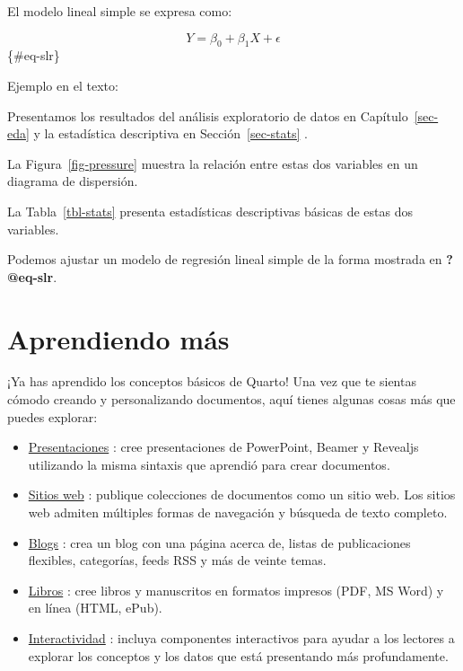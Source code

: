 \documentclass[
  spanish,
  12pt,
  letterpaper,
  DIV=11,
  numbers=noendperiod]{scrreprt}
\begin{document}
El modelo lineal simple se expresa como:

\[Y = \beta_0 + \beta_1 X + \epsilon\] \{\#eq-slr\}

Ejemplo en el texto:

Presentamos los resultados del análisis exploratorio de datos en
Capítulo~\ref{sec-eda} y la estadística descriptiva en
Sección~\ref{sec-stats} .

La Figura~\ref{fig-pressure} muestra la relación entre estas dos
variables en un diagrama de dispersión.

La Tabla~\ref{tbl-stats} presenta estadísticas descriptivas básicas de
estas dos variables.

Podemos ajustar un modelo de regresión lineal simple de la forma
mostrada en \textbf{?@eq-slr}.

\section{\texorpdfstring{\textbf{Aprendiendo
más}}{Aprendiendo más}}\label{aprendiendo-muxe1s}

¡Ya has aprendido los conceptos básicos de Quarto! Una vez que te
sientas cómodo creando y personalizando documentos, aquí tienes algunas
cosas más que puedes explorar:

\begin{itemize}
\item
  \href{https://quarto.org/docs/presentations/}{Presentaciones} : cree
  presentaciones de PowerPoint, Beamer y Revealjs utilizando la misma
  sintaxis que aprendió para crear documentos.
\item
  \href{https://quarto.org/docs/websites/}{Sitios web} : publique
  colecciones de documentos como un sitio web. Los sitios web admiten
  múltiples formas de navegación y búsqueda de texto completo.
\item
  \href{https://quarto.org/docs/websites/website-blog.html}{Blogs} :
  crea un blog con una página acerca de, listas de publicaciones
  flexibles, categorías, feeds RSS y más de veinte temas.
\item
  \href{https://quarto.org/docs/books/}{Libros} : cree libros y
  manuscritos en formatos impresos (PDF, MS Word) y en línea (HTML,
  ePub).
\item
  \href{https://quarto.org/docs/interactive/}{Interactividad} : incluya
  componentes interactivos para ayudar a los lectores a explorar los
  conceptos y los datos que está presentando más profundamente.
\end{itemize}
\end{document}
